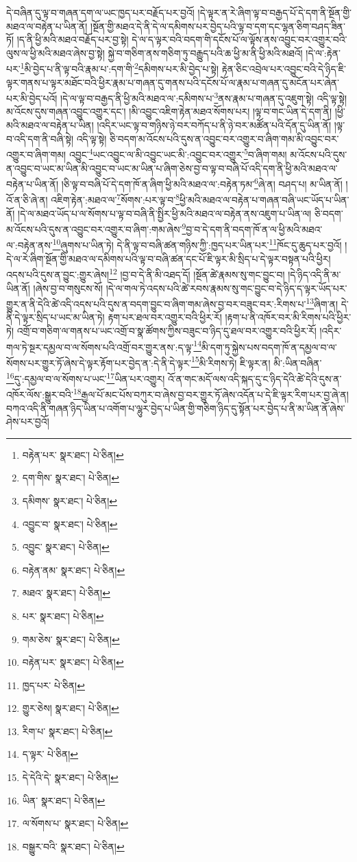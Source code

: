 དེ་བཞིན་དུ་ལྟ་བ་གཞན་དག་ལ་ཡང་ཁྱད་པར་བརྗོད་པར་བྱའོ། །དེ་ལྟར་ན་རེ་ཞིག་ལྟ་བ་བརྒྱད་པོ་དེ་དག་ནི་སྔོན་གྱི་མཐའ་ལ་བརྟེན་པ་ཡིན་ནོ། །སྔོན་གྱི་མཐའ་དེ་ནི་དེ་ལ་དམིགས་པར་བྱེད་པའི་ལྟ་བ་དག་དང་ལྷན་ཅིག་བཤད་ཟིན་ཏོ། །ད་ནི་ཕྱི་མའི་མཐའ་བརྗོད་པར་བྱ་སྟེ། དེ་ལ་ད་ལྟར་བའི་བདག་གི་དངོས་པོ་ལ་ལྟོས་ནས་འབྱུང་བར་འགྱུར་བའི་ལུས་ལ་ཕྱི་མའི་མཐའ་ཞེས་བྱ་སྟེ། སྐྱེ་བ་གཅིག་ནས་གཅིག་ཏུ་བརྒྱུད་པའི་ཆ་ཕྱི་མ་ནི་ཕྱི་མའི་མཐའོ། །དེ་ལ་:རྟེན་པར་\footnote{བརྟེན་པར་  སྣར་ཐང་།  པེ་ཅིན། }མི་བྱེད་པ་ནི་ལྟ་བའི་རྣམ་པ་:དག་གི་\footnote{དག་གིས་  སྣར་ཐང་།  པེ་ཅིན། }དམིགས་པར་མི་བྱེད་པ་སྟེ། རྟེན་ཅིང་འབྲེལ་པར་འབྱུང་བའི་དེ་ཉིད་ཇི་ལྟར་གནས་པ་ལྟར་མཐོང་བའི་ཕྱིར་རྣམ་པ་གཞན་དུ་གནས་པའི་དངོས་པོ་ལ་རྣམ་པ་གཞན་དུ་མངོན་པར་ཞེན་པར་མི་བྱེད་པའོ། །དེ་ལ་ལྟ་བ་བརྒྱད་ནི་ཕྱི་མའི་མཐའ་ལ་:དམིགས་པ་\footnote{དམིགས་  སྣར་ཐང་།  པེ་ཅིན། }ནས་རྣམ་པ་གཞན་དུ་འཇུག་སྟེ། འདི་ལྟ་སྟེ། མ་འོངས་དུས་གཞན་འབྱུང་འགྱུར་དང་། །མི་འབྱུང་འཇིག་རྟེན་མཐའ་སོགས་པར། །ལྟ་བ་གང་ཡིན་དེ་དག་ནི། །ཕྱི་མའི་མཐའ་ལ་བརྟེན་པ་ཡིན། །འདིར་ཡང་ལྟ་བ་གཉིས་ཉེ་བར་བཀོད་པ་ནི་ཉེ་བར་མཚོན་པའི་དོན་དུ་ཡིན་ནོ། །ལྟ་བ་འདི་དག་ནི་བཞི་སྟེ། འདི་ལྟ་སྟེ། ཅི་བདག་མ་འོངས་པའི་དུས་ན་འབྱུང་བར་འགྱུར་བ་ཞིག་གམ་མི་འབྱུང་བར་འགྱུར་བ་ཞིག་གམ། འབྱུང་\footnote{འབྱུང་བ་  སྣར་ཐང་།  པེ་ཅིན། }ཡང་འབྱུང་ལ་མི་འབྱུང་ཡང་མི་:འབྱུང་བར་འགྱུར་\footnote{འབྱུང་  སྣར་ཐང་།  པེ་ཅིན། }བ་ཞིག་གམ། མ་འོངས་པའི་དུས་ན་འབྱུང་བ་ཡང་མ་ཡིན་མི་འབྱུང་བ་ཡང་མ་ཡིན་པ་ཞིག་ཅེས་བྱ་བ་ལྟ་བ་བཞི་པོ་འདི་དག་ནི་ཕྱི་མའི་མཐའ་ལ་བརྟེན་པ་ཡིན་ནོ། །ཅི་ལྟ་བ་བཞི་པོ་དེ་དག་ཁོ་ན་ཞིག་ཕྱི་མའི་མཐའ་ལ་:བརྟེན་ཏམ་\footnote{བརྟེན་ནམ་  སྣར་ཐང་།  པེ་ཅིན། }ཞེ་ན། བཤད་པ། མ་ཡིན་ནོ། །འོ་ན་ཅི་ཞེ་ན། འཇིག་རྟེན་:མཐའ་ལ་\footnote{མཐའ་  སྣར་ཐང་།  པེ་ཅིན། }སོགས་:པར་ལྟ་བ་\footnote{པར་  སྣར་ཐང་།  པེ་ཅིན། }ཕྱི་མའི་མཐའ་ལ་བརྟེན་པ་གཞན་བཞི་ཡང་ཡོད་པ་ཡིན་ནོ། །དེ་ལ་མཐའ་ཡོད་པ་ལ་སོགས་པ་ལྟ་བ་བཞི་ནི་སྤྱིར་ཕྱི་མའི་མཐའ་ལ་བརྟེན་ནས་འཇུག་པ་ཡིན་ལ། ཅི་བདག་མ་འོངས་པའི་དུས་ན་འབྱུང་བར་འགྱུར་བ་ཞིག་:གམ་ཞེས་\footnote{གམ་ཅེས་  སྣར་ཐང་།  པེ་ཅིན། }བྱ་བ་དེ་དག་ནི་བདག་ཁོ་ན་ལ་ཕྱི་མའི་མཐའ་ལ་:བརྟེན་ནས་\footnote{བརྟེན་པར་  སྣར་ཐང་།  པེ་ཅིན། }ཞུགས་པ་ཡིན་ཏེ། དེ་ནི་ལྟ་བ་བཞི་ཚན་གཉིས་ཀྱི་:ཁྱད་པར་ཡིན་པར་\footnote{ཁྱད་པར་  པེ་ཅིན། }ཁོང་དུ་ཆུད་པར་བྱའོ། །དེ་ལ་རེ་ཞིག་སྔོན་གྱི་མཐའ་ལ་དམིགས་པའི་ལྟ་བ་བཞི་ཚན་དང་པོ་ཇི་ལྟར་མི་སྲིད་པ་དེ་ལྟར་བསྟན་པའི་ཕྱིར། འདས་པའི་དུས་ན་བྱུང་:གྱུར་ཞེས།\footnote{གྱུར་ཅེས།  སྣར་ཐང་།  པེ་ཅིན། } །བྱ་བ་དེ་ནི་མི་འཐད་དོ། །སྔོན་ཚེ་རྣམས་སུ་གང་བྱུང་བ། །དེ་ཉིད་འདི་ནི་མ་ཡིན་ནོ། །ཞེས་བྱ་བ་གསུངས་སོ། །དེ་ལ་གལ་ཏེ་འདས་པའི་ཚེ་རབས་རྣམས་སུ་གང་བྱུང་བ་དེ་ཉིད་ད་ལྟར་ཡོད་པར་གྱུར་ན་ནི་དེའི་ཚེ་འདི་འདས་པའི་དུས་ན་བདག་བྱུང་བ་ཞིག་གམ་ཞེས་བྱ་བར་བཟུང་བར་:རིགས་པ་\footnote{རིག་པ་  སྣར་ཐང་།  པེ་ཅིན། }ཞིག་ན། དེ་ནི་དེ་ལྟར་སྲིད་པ་ཡང་མ་ཡིན་ཏེ། རྟག་པར་ཐལ་བར་འགྱུར་བའི་ཕྱིར་རོ། །རྟག་པ་ནི་འཁོར་བར་མི་རིགས་པའི་ཕྱིར་ཏེ། འགྲོ་བ་གཅིག་ལ་གནས་པ་ཡང་འགྲོ་བ་སྣ་ཚོགས་ཀྱིས་བཟུང་བ་ཉིད་དུ་ཐལ་བར་འགྱུར་བའི་ཕྱིར་རོ། །འདིར་གལ་ཏེ་སྔར་དམྱལ་བ་ལ་སོགས་པའི་འགྲོ་བར་གྱུར་ནས་:ད་ལྟ་\footnote{ད་ལྟར་  པེ་ཅིན། }མི་དག་ཏུ་སྐྱེས་པས་བདག་ཁོ་ན་དམྱལ་བ་ལ་སོགས་པར་གྱུར་ཏོ་ཞེས་དེ་ལྟར་རྟོག་པར་བྱེད་ན་:དེ་ནི་དེ་ལྟར་\footnote{དེ་དེའི་དེ་  སྣར་ཐང་།  པེ་ཅིན། }མི་རིགས་ཏེ། ཇི་ལྟར་ན། མི་:ཡིན་བཞིན་\footnote{ཡིན་  སྣར་ཐང་།  པེ་ཅིན། }དུ་:དམྱལ་བ་ལ་སོགས་པ་ཡང་\footnote{ལ་སོགས་པ་  སྣར་ཐང་།  པེ་ཅིན། }ཡིན་པར་འགྱུར། འོ་ན་གང་མདོ་ལས་འདི་སྐད་དུ་ང་ཉིད་དེའི་ཚེ་དེའི་དུས་ན་འཁོར་ལོས་:སྒྱུར་བའི་\footnote{བསྒྱུར་བའི་  སྣར་ཐང་།  པེ་ཅིན། }རྒྱལ་པོ་མང་པོས་བཀུར་བ་ཞེས་བྱ་བར་གྱུར་ཏོ་ཞེས་འདོན་པ་དེ་ཇི་ལྟར་རིག་པར་བྱ་ཞེ་ན། བཀའ་འདི་ནི་གཞན་ཉིད་ཡིན་པ་འགོག་པ་ལྷུར་བྱེད་པ་ཡིན་གྱི་གཅིག་ཉིད་དུ་སྟོན་པར་བྱེད་པ་ནི་མ་ཡིན་ནོ་ཞེས་ཤེས་པར་བྱའོ། 